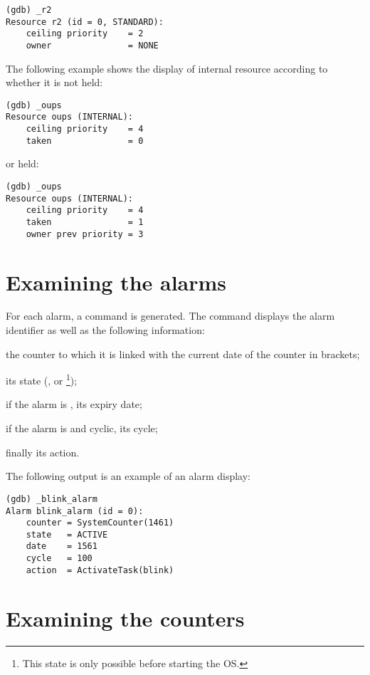 \begin{lstlisting}
(gdb) _r2
Resource r2 (id = 0, STANDARD):
	ceiling priority    = 2
	owner               = NONE
\end{lstlisting} 

The following example shows the display of internal resource  according to whether it is not held:

\begin{lstlisting}
(gdb) _oups 
Resource oups (INTERNAL):
	ceiling priority    = 4
	taken               = 0
\end{lstlisting} 

or held:

\begin{lstlisting}
(gdb) _oups 
Resource oups (INTERNAL):
	ceiling priority    = 4
	taken               = 1
	owner prev priority = 3
\end{lstlisting} 

\section{Examining the alarms}

For each alarm, a command  is generated. The command displays the alarm identifier as well as the following information:

\begin{pitemize}
\item the counter to which it is linked with the current date of the counter in brackets;
\item its state (,  or \footnote{This state is only possible before starting the OS.});
\item if the alarm is , its expiry date;
\item if the alarm is  and cyclic, its cycle;
\item finally its action.
\end{pitemize}

The following output is an example of an alarm display:

\begin{lstlisting}
(gdb) _blink_alarm 
Alarm blink_alarm (id = 0):
	counter = SystemCounter(1461)
	state   = ACTIVE
	date    = 1561
	cycle   = 100
	action  = ActivateTask(blink)
\end{lstlisting}

\section{Examining the counters}

